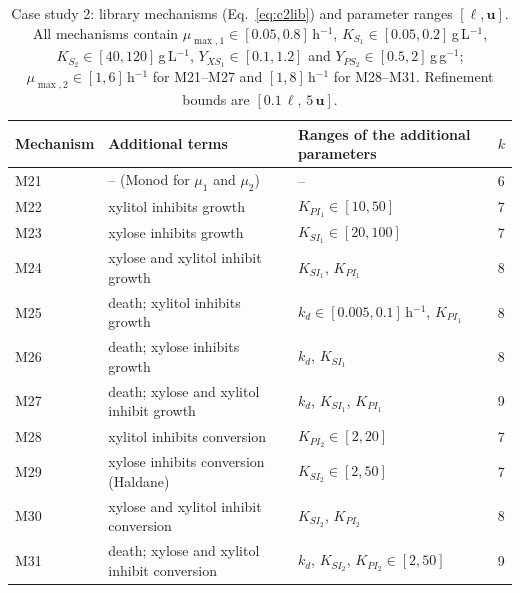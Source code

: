 \begin{table}[width=\textwidth,cols=4,pos=t]
\caption{Case study 2: library mechanisms (Eq.~\eqref{eq:c2lib}) and parameter ranges $[\boldsymbol{\ell},\mathbf{u}]$. All mechanisms contain $\mu_{\max,1}\in[0.05,0.8]$\,h$^{-1}$, $K_{S_1}\in[0.05,0.2]$\,g\,L$^{-1}$, $K_{S_2}\in[40,120]$\,g\,L$^{-1}$, $Y_{XS_1}\in[0.1,1.2]$ and $Y_{PS_2}\in[0.5,2]$\,g\,g$^{-1}$; $\mu_{\max,2}\in[1,6]$\,h$^{-1}$ for M21--M27 and $[1,8]$\,h$^{-1}$ for M28--M31. Refinement bounds are $[0.1\,\boldsymbol{\ell},\,5\,\mathbf{u}]$.}\label{tab:c2lib}
\begin{tabular*}{\tblwidth}{@{}LLLL@{}}
\toprule
Mechanism & Additional terms & Ranges of the additional parameters & $k$ \\
\midrule
M21 & -- (Monod for $\mu_1$ and $\mu_2$) & -- & 6 \\
M22 & xylitol inhibits growth & $K_{PI_1}\in[10,50]$ & 7 \\
M23 & xylose inhibits growth & $K_{SI_1}\in[20,100]$ & 7 \\
M24 & xylose and xylitol inhibit growth & $K_{SI_1}$, $K_{PI_1}$ & 8 \\
M25 & death; xylitol inhibits growth & $k_d\in[0.005,0.1]$\,h$^{-1}$, $K_{PI_1}$ & 8 \\
M26 & death; xylose inhibits growth & $k_d$, $K_{SI_1}$ & 8 \\
M27 & death; xylose and xylitol inhibit growth & $k_d$, $K_{SI_1}$, $K_{PI_1}$ & 9 \\
M28 & xylitol inhibits conversion & $K_{PI_2}\in[2,20]$ & 7 \\
M29 & xylose inhibits conversion (Haldane) & $K_{SI_2}\in[2,50]$ & 7 \\
M30 & xylose and xylitol inhibit conversion & $K_{SI_2}$, $K_{PI_2}$ & 8 \\
M31 & death; xylose and xylitol inhibit conversion & $k_d$, $K_{SI_2}$, $K_{PI_2}\in[2,50]$ & 9 \\
\bottomrule
\end{tabular*}
\end{table}

